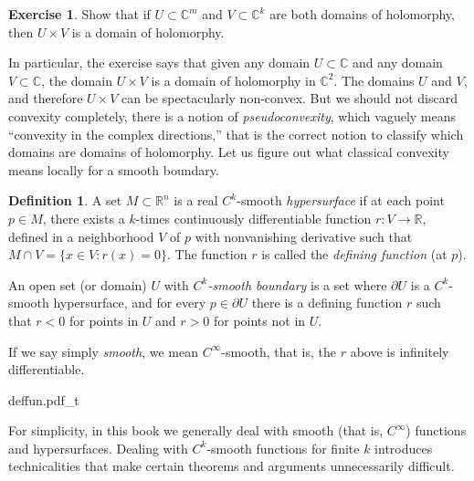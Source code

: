 \documentclass[12pt,openany]{book}
\newcommand{\C}{{\mathbb{C}}}
\newcommand{\R}{{\mathbb{R}}}
\newcommand{\myindex}[1]{#1\index{#1}}
\theoremstyle{plain}
\theoremstyle{remark}
\theoremstyle{definition}
\newtheorem{defn}[thm]{Definition}
\newenvironment{exbox}{%
    \def\FrameCommand{\vrule width 1pt \relax\hspace {10pt}}%
    \MakeFramed {\advance \hsize -\width \FrameRestore }%
}{%
    \endMakeFramed
}
\newenvironment{myfig}{%
    \begin{center}
}{%
    \end{center}
}
\theoremstyle{exercise}
\newtheorem{exercise}{Exercise}[section]
\theoremstyle{example}
\begin{document}
\begin{exbox}
\begin{exercise}
Show that if $U \subset \C^m$ and $V \subset \C^k$ are both domains of
holomorphy, then $U \times V$ is a domain of holomorphy.
\end{exercise}
\end{exbox}

In particular, the exercise says that
given any domain $U \subset \C$ and any domain $V \subset \C$, the domain
$U \times V$ is a domain of holomorphy in $\C^2$.  The domains
$U$ and $V$, and therefore $U \times V$ can be spectacularly non-convex.
But we should not discard convexity completely, there is a notion of
\emph{pseudoconvexity}, which vaguely means ``convexity in the 
complex directions,'' that is the correct notion to classify which
domains are domains of holomorphy.
Let us figure out what classical convexity means locally for a smooth boundary.

\begin{defn} \label{def:hypersurface}
A set $M \subset \R^n$ is a real
%
$C^k$-smooth \emph{\myindex{hypersurface}}%
if at each point
$p \in M$, there exists a $k$-times continuously
differentiable function $r \colon V \to
\R$, defined in a neighborhood $V$ of $p$ with nonvanishing derivative
such that $M \cap V = \bigl\{ x \in V : r(x) = 0 \bigr\}$.  The function $r$ is
called the \emph{\myindex{defining function}} (at $p$).

An open set (or domain) $U$ with
\emph{$C^k$-smooth boundary}%
is a set where
$\partial U$ is a $C^k$-smooth hypersurface,
and for every $p \in \partial U$ there is a defining
function $r$ such that
$r < 0$ for points in $U$ and $r > 0$
for points not in $U$.

If we say simply
%
%
\emph{smooth},
%
we mean $C^\infty$-smooth,
that is, the $r$ above is infinitely differentiable.
\end{defn}

\begin{myfig}
{deffun.pdf_t}
\end{myfig}

For simplicity, in this book we generally deal with smooth
(that is, $C^\infty$) functions and hypersurfaces.  Dealing with
$C^k$-smooth functions for finite $k$ introduces technicalities that make
certain theorems and arguments unnecessarily difficult.
\end{document}
